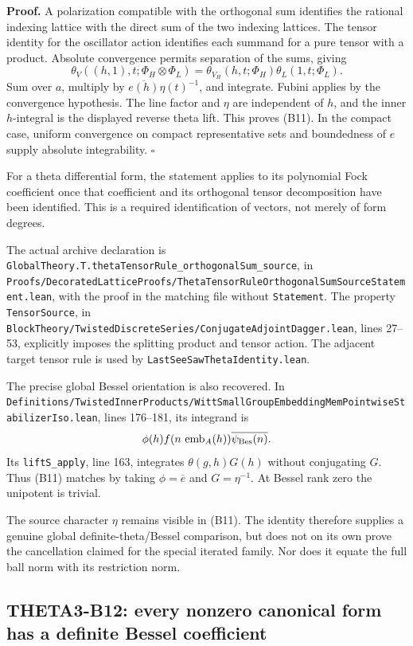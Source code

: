 \textbf{Proof.} A polarization compatible with the orthogonal sum identifies the rational indexing lattice with the direct sum of the two indexing lattices. The tensor identity for the oscillator action identifies each summand for a pure tensor with a product. Absolute convergence permits separation of the sums, giving
\[
 \theta_V((h,1),t;\Phi_H\otimes\Phi_L)
       =\theta_{V_H}(h,t;\Phi_H)\theta_L(1,t;\Phi_L).
\]
Sum over $a$, multiply by $\overline{e(h)}\eta(t)^{-1}$, and integrate. Fubini applies by the convergence hypothesis. The line factor and $\eta$ are independent of $h$, and the inner $h$-integral is the displayed reverse theta lift. This proves (B11). In the compact case, uniform convergence on compact representative sets and boundedness of $e$ supply absolute integrability. \hfill$\square$

For a theta differential form, the statement applies to its polynomial Fock coefficient once that coefficient and its orthogonal tensor decomposition have been identified. This is a required identification of vectors, not merely of form degrees.

The actual archive declaration is
\texttt{GlobalTheory.T.thetaTensorRule\_orthogonalSum\_source}, in
\texttt{Proofs/DecoratedLatticeProofs/ThetaTensorRuleOrthogonalSumSourceStatement.lean}, with the proof in the matching file without \texttt{Statement}. The property \texttt{TensorSource}, in \texttt{BlockTheory/TwistedDiscreteSeries/ConjugateAdjointDagger.lean}, lines 27--53, explicitly imposes the splitting product and tensor action. The adjacent target tensor rule is used by \texttt{LastSeeSawThetaIdentity.lean}.

The precise global Bessel orientation is also recovered. In
\texttt{Definitions/TwistedInnerProducts/WittSmallGroupEmbeddingMemPointwiseStabilizerIso.lean}, lines 176--181, its integrand is
\[
 \phi(h)f(n\,\operatorname{emb}_A(h))\overline{\psi_{\rm Bes}(n)}.
\]
Its \texttt{liftS\_apply}, line 163, integrates $\theta(g,h)G(h)$ without conjugating $G$. Thus (B11) matches by taking $\phi=\overline e$ and $G=\eta^{-1}$. At Bessel rank zero the unipotent is trivial.

The source character $\eta$ remains visible in (B11). The identity therefore supplies a genuine global definite-theta/Bessel comparison, but does not on its own prove the cancellation claimed for the special iterated family. Nor does it equate the full ball norm with its restriction norm.

\subsection{THETA3-B12: every nonzero canonical form has a definite Bessel coefficient}\label{B12}

